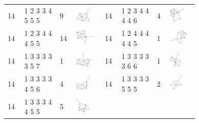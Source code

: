 \begin{footnotesize}
\begin{longtable}{
        m{0.05\linewidth} m{0.15\linewidth} m{0.05\linewidth} m{0.12\linewidth} |
        m{0.05\linewidth} m{0.15\linewidth} m{0.05\linewidth} m{0.12\linewidth}
    }
14 & 1 2 3 3 4 5 5 5 & 9 & \includegraphics[height=0.7151cm]{15-universal-graphs/img/degree-sequences-example-graphs/graph-4-8-70} &
14 & 1 2 3 4 4 4 4 6 & 4 & \includegraphics[height=0.7151cm]{15-universal-graphs/img/degree-sequences-example-graphs/graph-4-8-71}\\
14 & 1 2 3 4 4 4 5 5 & 14 & \includegraphics[height=0.7151cm]{15-universal-graphs/img/degree-sequences-example-graphs/graph-4-8-72} &
14 & 1 2 4 4 4 4 4 5 & 1 & \includegraphics[height=0.7151cm]{15-universal-graphs/img/degree-sequences-example-graphs/graph-4-8-73}\\
14 & 1 3 3 3 3 3 5 7 & 1 & \includegraphics[height=0.7151cm]{15-universal-graphs/img/degree-sequences-example-graphs/graph-4-8-74} &
14 & 1 3 3 3 3 3 6 6 & 1 & \includegraphics[height=0.7151cm]{15-universal-graphs/img/degree-sequences-example-graphs/graph-4-8-75}\\
14 & 1 3 3 3 3 4 5 6 & 4 & \includegraphics[height=0.7151cm]{15-universal-graphs/img/degree-sequences-example-graphs/graph-4-8-76} &
14 & 1 3 3 3 3 5 5 5 & 2 & \includegraphics[height=0.7151cm]{15-universal-graphs/img/degree-sequences-example-graphs/graph-4-8-77}\\
14 & 1 3 3 3 4 4 5 5 & 5 & \includegraphics[height=0.7151cm]{15-universal-graphs/img/degree-sequences-example-graphs/graph-4-8-78} &

\end{longtable}
\end{footnotesize}
